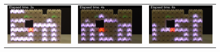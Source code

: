 {
	\newcommand{\subFigureWidth}{0.32\linewidth}
	\begin{figure}[h!]
		\centering			
		\small
		\begin{tabular}{c c c}
			\includegraphics[width=\subFigureWidth]{images/time-synchronization/scroller/sync_3s}  &
			\includegraphics[width=\subFigureWidth]{images/time-synchronization/scroller/sync_4s} & 
			\includegraphics[width=\subFigureWidth]{images/time-synchronization/scroller/sync_6s}\\
			

\end{tabular}
\end{figure}}
